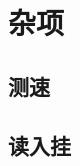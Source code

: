 \documentclass[a4paper]{article}
\begin{document}
\section{杂项}
\subsection{测速}
%
\subsection{读入挂}
%
%
%
%


\end{document}
